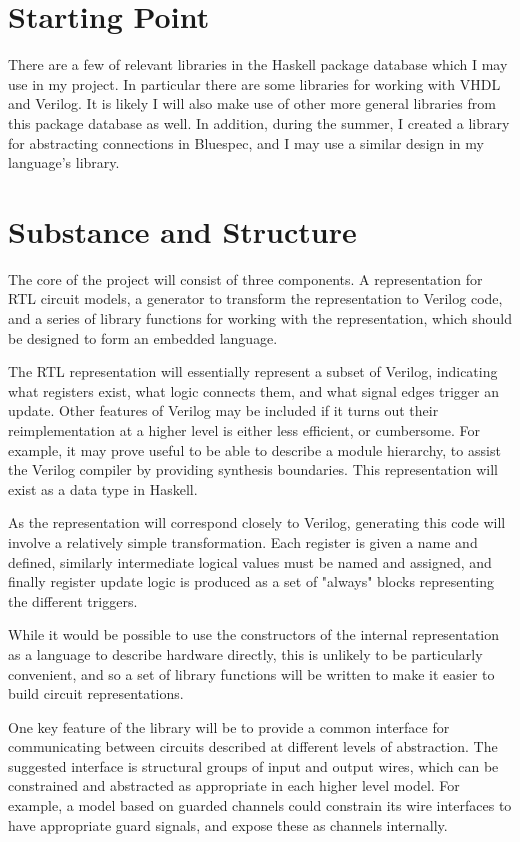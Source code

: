 \section*{Starting Point}

There are a few of relevant libraries in the Haskell package 
database which I may use in my project. In particular there 
are some libraries for working with VHDL and Verilog. It is 
likely I will also make use of other more general libraries 
from this package database as well.
In addition, during the summer, I created a library for 
abstracting connections in Bluespec, and I may use a similar 
design in my language's library.

\section*{Substance and Structure}

The core of the project will consist of three components. A 
representation for RTL circuit models, a generator to 
transform the representation to Verilog code, and a series 
of library functions for working with the representation, 
which should be designed to form an embedded language.

The RTL representation will essentially represent a subset 
of Verilog, indicating what registers exist, what logic 
connects them, and what signal edges trigger an update.  
Other features of Verilog may be included if it turns out 
their reimplementation at a higher level is either less 
efficient, or cumbersome. For example, it may prove useful 
to be able to describe a module hierarchy, to assist the 
Verilog compiler by providing synthesis boundaries. This 
representation will exist as a data type in Haskell.

As the representation will correspond closely to Verilog, 
generating this code will involve a relatively simple 
transformation. Each register is given a name and defined, 
similarly intermediate logical values must be named and 
assigned, and finally register update logic is produced as a 
set of "always" blocks representing the different triggers.  

While it would be possible to use the constructors of the 
internal representation as a language to describe hardware 
directly, this is unlikely to be particularly convenient, 
and so a set of library functions will be written to make it 
easier to build circuit representations.

One key feature of the library will be to provide a common 
interface for communicating between circuits described at 
different levels of abstraction. The suggested interface is 
structural groups of input and output wires, which can be 
constrained and abstracted as appropriate in each higher 
level model. For example, a model based on guarded channels 
could constrain its wire interfaces to have appropriate 
guard signals, and expose these as channels internally.

